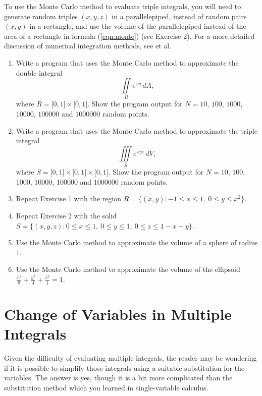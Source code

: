 To use the Monte Carlo method to evaluate triple integrals, you will need to generate random triples $(x,y,z)$ in a
parallelepiped, instead of random pairs $(x,y)$ in a rectangle, and use the volume of the parallelepiped instead of the
area of a rectangle in formula (\ref{eqn:monte}) (see Exercise 2). For a more detailed discussion of numerical
integration methods, see \cite{ptvf} et al.
\startexercises\label{sec3dot4}
\begin{enumerate}[\bfseries 1.]
 \item Write a program that uses the Monte Carlo method to approximate the double integral
  \[\iint\limits_{R} e^{xy}\,dA,\] 
  where $R = \lbrack 0,1 \rbrack \times \lbrack 0,1 \rbrack$. Show the program output
  for $N=10$, $100$, $1000$, $10000$, $100000$ and $1000000$ random points.
 \item Write a program that uses the Monte Carlo method to approximate the triple integral
  \[\iiint\limits_{S} e^{xyz}\,dV,\] 
  where $S= \lbrack 0,1 \rbrack \times \lbrack 0,1 \rbrack \times \lbrack 0,1 \rbrack$.
  Show the program output for $N=10$, $100$, $1000$, $10000$, $100000$ and $1000000$ random points.
 \item Repeat Exercise 1 with the region $R = \lbrace (x,y): -1 \le x \le 1,~ 0 \le y \le x^2 \rbrace$.
 \item Repeat Exercise 2 with the solid $S = \lbrace (x,y,z): 0 \le x \le 1,~ 0 \le y \le 1,~
  0 \le z \le 1 - x - y \rbrace$.
 \item Use the Monte Carlo method to approximate the volume of a sphere of radius $1$.
 \item Use the Monte Carlo method to approximate the volume of the ellipsoid $\frac{x^2}{9}+\frac{y^2}{4}+
  \frac{z^2}{1}=1$.
\end{enumerate}
\newpage
\section{Change of Variables in Multiple Integrals}
Given the difficulty of evaluating multiple integrals, the reader may be wondering if it is possible to simplify
those integrals using a suitable substitution for the variables. The answer is yes, though it is a bit more complicated
than the substitution method which you learned in single-variable calculus.

